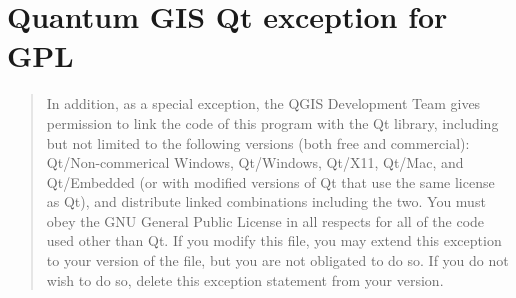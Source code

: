 \section{Quantum GIS Qt exception for GPL}
\label{qgis_qt_exception_appendix}

\begin{quotation}
In addition, as a special exception, the QGIS Development Team gives
permission to link the code of this program with the Qt library,
including but not limited to the following versions (both free and
commercial): Qt/Non-commerical Windows, Qt/Windows, Qt/X11, Qt/Mac, and
Qt/Embedded (or with modified versions of Qt that use the same license
as Qt), and distribute linked combinations including the two. You must
obey the GNU General Public License in all respects for all of the code
used other than Qt. If you modify this file, you may extend this
exception to your version of the file, but you are not obligated to do
so. If you do not wish to do so, delete this exception statement from
your version.
\end{quotation} 

